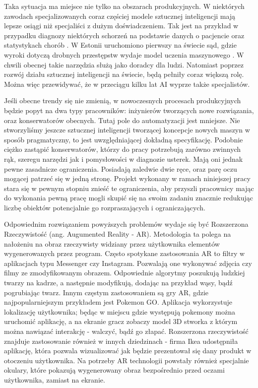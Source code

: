 \documentclass[12pt,twoside,polish]{article}
\begin{document}
Taka sytuacja ma miejsce nie tylko na obszarach produkcyjnych. W niektórych zawodach specjalizowanych coraz częściej modele sztucznej inteligencji mają lepsze osiągi niż specjaliści z dużym doświadczeniem. Tak jest na przykład w przypadku diagnozy niektórych schorzeń na podstawie danych o pacjencie oraz statystykach chorób \cite{healthcare}. W Estonii uruchomiono pierwszy na świecie sąd, gdzie wyroki dotyczą drobnych przestępstw wydaje model uczenia maszynowego \cite{judges}. W chwili obecnej takie narzędzia służą jako doradcy dla ludzi. Natomiast poprzez rozwój działu sztucznej inteligencji na świecie, będą pełniły coraz większą rolę. Można więc przewidywać, że w przeciągu kilku lat AI wyprze także specjalistów.

Jeśli obecne trendy się nie zmienią, w nowoczesnych procesach produkcyjnych będzie popyt na dwa typy pracowników: inżynierów tworzących nowe rozwiązania, oraz konserwatorów obecnych. Tutaj pole do automatyzacji jest mniejsze. Nie stworzyliśmy jeszcze sztucznej inteligencji tworzącej koncepcje nowych maszyn w sposób pragmatyczny, to jest uwzględniającej dokładną specyfikację. Podobnie ciężko zastąpić konserwatorów, którzy do pracy potrzebują zarówno zwinnych rąk, szeregu narzędzi jak i pomysłowości w diagnozie usterek. Mają oni jednak pewne zasadnicze ograniczenia. Posiadają zaledwie dwie ręce, oraz parę oczu mogącej patrzeć się w jedną stronę. Projekt wykonany w ramach niniejszej pracy stara się w pewnym stopniu znieść te ograniczenia, aby przyszli pracownicy mając do wykonania pewną pracę mogli skupić się na swoim zadaniu znacznie redukując liczbę obiektów potencjalnie go rozpraszających i ograniczających.

Odpowiednim rozwiązaniem powyższych problemów wydaje się być Rozszerzona Rzeczywistość (ang. Augumented Reality - AR). Metodologia ta polega na nałożeniu na obraz rzeczywisty widziany przez użytkownika elementów wygenerowanych przez program. Często spotykane zastosowania AR to filtry w aplikacjach typu Messenger czy Instagram. Pozwalają one wykonywać zdjęcia czy filmy ze zmodyfikowanym obrazem. Odpowiednie algorytmy poszukują ludzkiej twarzy na kadrze, a następnie modyfikują, dodając na przykład wąsy, bądź pogrubiając twarz. Innym częstym zastosowaniem są gry AR, gdzie najpopularniejszym przykładem jest Pokemon GO. Aplikacja wykorzystuje lokalizację użytkownika; będąc w miejscu gdzie występują pokemony można uruchomić aplikację, a na ekranie gracz zobaczy model 3D stworka z którym można nawiązać interakcję - walczyć, bądź go złapać. Rozszerzona rzeczywistość znajduje zastosowanie również w innych dziedzinach - firma Ikea udostępniła aplikację, która pozwala wizualizować jak będzie prezentował się dany produkt w otoczeniu użytkownika. Na potrzeby AR technologii powstały również specjalnie okulary, które pokazują wygenerowany obraz bezpośrednio przed oczami użytkownika, zamiast na ekranie.
\end{document}
